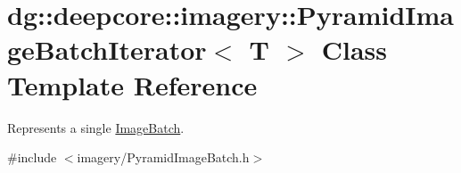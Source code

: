 \hypertarget{classdg_1_1deepcore_1_1imagery_1_1_pyramid_image_batch_iterator}{}\section{dg\+:\+:deepcore\+:\+:imagery\+:\+:Pyramid\+Image\+Batch\+Iterator$<$ T $>$ Class Template Reference}
\label{classdg_1_1deepcore_1_1imagery_1_1_pyramid_image_batch_iterator}


Represents a single \hyperlink{classdg_1_1deepcore_1_1imagery_1_1_image_batch}{Image\+Batch}.  




{\ttfamily \#include $<$imagery/\+Pyramid\+Image\+Batch.\+h$>$}

